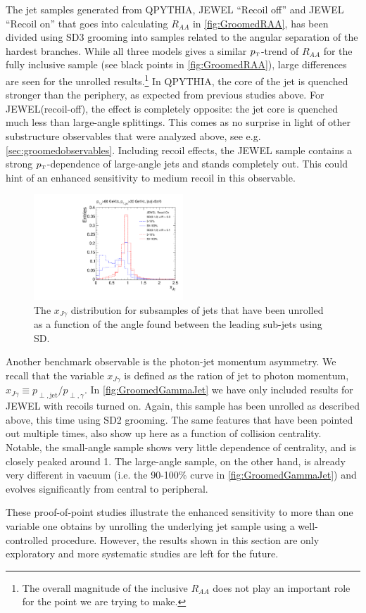 The jet samples generated from QPYTHIA, JEWEL ``Recoil off'' and JEWEL ``Recoil on'' that goes into calculating $R_{AA}$ in \autoref{fig:GroomedRAA}, has been divided using SD3 grooming into samples related to the angular separation of the hardest branches. While all three models gives a similar $p_{\text{\tiny T}}$-trend of $R_{AA}$ for the fully inclusive sample (see black points in \autoref{fig:GroomedRAA}), large differences are seen for the unrolled results.\footnote{The overall magnitude of the inclusive $R_{AA}$ does not play an important role for the point we are trying to make.} In QPYTHIA, the core of the jet is quenched stronger than the periphery, as expected from previous studies above. For JEWEL(recoil-off), the effect is completely opposite: the jet core is quenched much less than large-angle splittings. This comes as no surprise in light  of other substructure observables that were analyzed above, see e.g. \autoref{sec:groomedobservables}. Including recoil effects, the JEWEL sample contains a strong $p_{\text{\tiny T}}$-dependence of large-angle jets and stands completely out. This could hint of an enhanced sensitivity to medium recoil in this observable.

\begin{figure}[th]
\centering
\includegraphics[width=0.5\textwidth]
{figures/Observables_GammaJet/JEWEL-photon-jet-recoilOn-linear}%
\caption{The $x_{J\gamma}$ distribution for subsamples of jets that have been unrolled as a function of the angle found between the leading sub-jets using SD. }
\label{fig:GroomedGammaJet}
\end{figure}
Another benchmark observable is the photon-jet momentum asymmetry. We recall that the variable $x_{J\gamma}$ is defined as the ration of jet to photon momentum, $x_{J\gamma} \equiv p_{\perp,\text{jet}}/p_{\perp,\gamma}$.
In \autoref{fig:GroomedGammaJet} we have only included results for JEWEL with recoils turned on. Again, this sample has been unrolled as described above, this time using SD2 grooming. The same features that have been pointed out multiple times, also show up here as a function of collision centrality. Notable, the small-angle sample shows very little dependence of centrality, and is closely peaked around 1. The large-angle sample, on the other hand, is already very different in vacuum (i.e. the 90-100\% curve in \autoref{fig:GroomedGammaJet}) and evolves significantly from central to peripheral. 

These proof-of-point studies illustrate the enhanced sensitivity to more than one variable one obtains by unrolling the underlying jet sample using a well-controlled procedure.
However, the results shown in this section are only exploratory and more systematic studies are left for the future.
